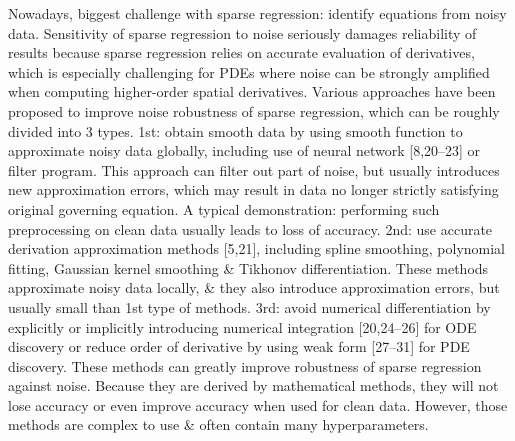 \documentclass{article}
\begin{document}
\begin{itemize}
	Nowadays, biggest challenge with sparse regression: identify equations from noisy data. Sensitivity of sparse regression to noise seriously damages reliability of results because sparse regression relies on accurate evaluation of derivatives, which is especially challenging for PDEs where noise can be strongly amplified when computing higher-order spatial derivatives. Various approaches have been proposed to improve noise robustness of sparse regression, which can be roughly divided into 3 types. 1st: obtain smooth data by using smooth function to approximate noisy data globally, including use of neural network [8,20--23] or filter program. This approach can filter out part of noise, but usually introduces new approximation errors, which may result in data no longer strictly satisfying original governing equation. A typical demonstration: performing such preprocessing on clean data usually leads to loss of accuracy. 2nd: use accurate derivation approximation methods [5,21], including spline smoothing, polynomial fitting, Gaussian kernel smoothing \& Tikhonov differentiation. These methods approximate noisy data locally, \& they also introduce approximation errors, but usually small than 1st type of methods. 3rd: avoid numerical differentiation by explicitly or implicitly introducing numerical integration [20,24--26] for ODE discovery or reduce order of derivative by using weak form [27--31] for PDE discovery. These methods can greatly improve robustness of sparse regression against noise. Because they are derived by mathematical methods, they will not lose accuracy or even improve accuracy when used for clean data. However, those methods are complex to use \& often contain many hyperparameters.
	

\end{itemize}
\end{document}
